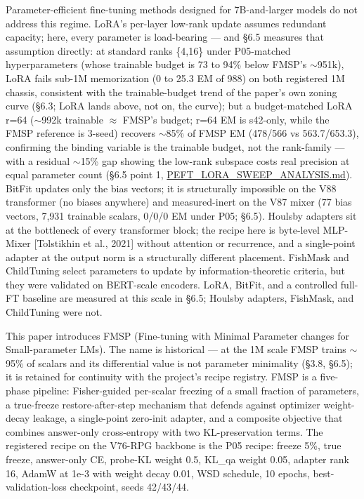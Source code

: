 \documentclass[11pt]{article}
\begin{document}
Parameter-efficient fine-tuning methods designed for 7B-and-larger models do not address this regime. LoRA's per-layer low-rank update assumes redundant capacity; here, every parameter is load-bearing --- and \S6.5 measures that assumption directly: at standard ranks \{4,16\} under P05-matched hyperparameters (whose trainable budget is 73 to 94\% below FMSP's $\sim$951k), LoRA fails sub-1M memorization (0 to 25.3 EM of 988) on both registered 1M chassis, consistent with the trainable-budget trend of the paper's own zoning curve (\S6.3; LoRA lands above, not on, the curve); but a budget-matched LoRA r=64 ($\sim$992k trainable $\approx$ FMSP's budget; r=64 EM is s42-only, while the FMSP reference is 3-seed) recovers $\sim$85\% of FMSP EM (478/566 vs 563.7/653.3), confirming the binding variable is the trainable budget, not the rank-family --- with a residual $\sim$15\% gap showing the low-rank subspace costs real precision at equal parameter count (\S6.5 point 1, \href{https://github.com/llaa33219/MicroMixer-4/blob/4bb630413dfa58ef3141291e121ab8c006d03235/PEFT_LORA_SWEEP_ANALYSIS.md}{PEFT\_LORA\_SWEEP\_ANALYSIS.md}). BitFit updates only the bias vectors; it is structurally impossible on the V88 transformer (no biases anywhere) and measured-inert on the V87 mixer (77 bias vectors, 7{,}931 trainable scalars, 0/0/0 EM under P05; \S6.5). Houlsby adapters sit at the bottleneck of every transformer block; the recipe here is byte-level MLP-Mixer [Tolstikhin et al., 2021] without attention or recurrence, and a single-point adapter at the output norm is a structurally different placement. FishMask and ChildTuning select parameters to update by information-theoretic criteria, but they were validated on BERT-scale encoders. LoRA, BitFit, and a controlled full-FT baseline are measured at this scale in \S6.5; Houlsby adapters, FishMask, and ChildTuning were not.

This paper introduces FMSP (Fine-tuning with Minimal Parameter changes for Small-parameter LMs). The name is historical --- at the 1M scale FMSP trains $\sim$95\% of scalars and its differential value is not parameter minimality (\S3.8, \S6.5); it is retained for continuity with the project's recipe registry. FMSP is a five-phase pipeline: Fisher-guided per-scalar freezing of a small fraction of parameters, a true-freeze restore-after-step mechanism that defends against optimizer weight-decay leakage, a single-point zero-init adapter, and a composite objective that combines answer-only cross-entropy with two KL-preservation terms. The registered recipe on the V76-RPG backbone is the P05 recipe: freeze 5\%, true freeze, answer-only CE, probe-KL weight 0.5, KL\_qa weight 0.05, adapter rank 16, AdamW at 1e-3 with weight decay 0.01, WSD schedule, 10 epochs, best-validation-loss checkpoint, seeds 42/43/44.
\end{document}
